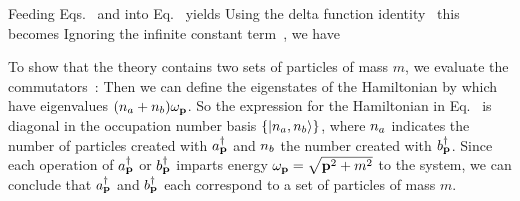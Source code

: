 \documentclass[11pt]{article}
\begin{document}
{	Feeding Eqs.~ and  into Eq.~ yields
	Using the delta function identity~\cite{Dirac}
	this becomes
	Ignoring the infinite constant term~\cite[p.~21]{Peskin}, we have
	
	To show that the theory contains two sets of particles of mass $m$, we evaluate the commutators~\cite[p.~22]{Peskin}:
	Then we can define the eigenstates of the Hamiltonian by
	\eq{
		(\apdag)^{\na} \,(\bpdag)^{\nb} \koo \equiv \knanb,
	}
	which have eigenvalues $(n_a + n_b) \omega_{\vb{p}}$.  So the expression for the Hamiltonian in Eq.~ is diagonal in the occupation number basis $\{ \ket{n_a, n_b} \}$, where $n_a$ indicates the number of particles created with $a_{\vb{p}}^\dagger$ and $n_b$ the number created with $b_{\vb{p}}^\dagger$.  Since each operation of $a_{\vb{p}}^\dagger$ or $b_{\vb{p}}^\dagger$ imparts energy $\omega_{\vb{p}} = \sqrt{\vb{p}^2 + m^2}$ to the system, we can conclude that $a_{\vb{p}}^\dagger$ and $b_{\vb{p}}^\dagger$ each correspond to a set of particles of mass $m$.
}
\end{document}
